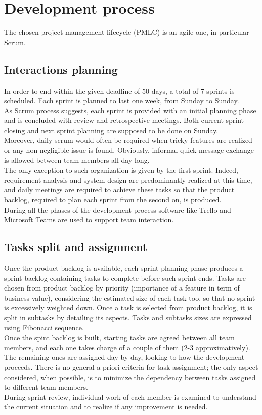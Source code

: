 \chapter{Development process}

The chosen project management lifecycle (PMLC) is an agile one, in particular Scrum. 
\section{Interactions planning}

In order to end within the given deadline of 50 days, a total of 7 sprints is scheduled. Each sprint is planned to last one week, from Sunday to Sunday.
\\
As Scrum process suggests, each sprint is provided with an initial planning phase and is concluded with review and retrospective meetings. Both current sprint closing and next sprint planning are supposed to be done on Sunday.
\\
Moreover, daily scrum would often be required when tricky features are realized or any non negligible issue is found. Obviously, informal quick message exchange is allowed between team members all day long.
\\
The only exception to such organization is given by the first sprint. Indeed, requirement analysis and system design are predominantly realized at this time, and daily meetings are required to achieve these tasks so that the product backlog, required to plan each sprint from the second on, is produced.
\\
During all the phases of the development process software like Trello and Microsoft Teams are used to support team interaction.


\section{Tasks split and assignment}

Once the product backlog is available, each sprint planning phase produces a sprint backlog containing tasks to complete before such sprint ends. Tasks are chosen from product backlog by priority (importance of a feature in term of business value), considering the estimated size of each task too, so that no sprint is excessively weighted down. Once a task is selected from product backlog, it is split in subtasks by detailing its aspects. Tasks and subtasks sizes are expressed using Fibonacci sequence. 
\\
Once the spint backlog is built, starting tasks are agreed between all team members, and each one takes charge of a couple of them (2-3 approximatively). The remaining ones are assigned day by day, looking to how the development proceeds. There is no general a priori criteria for task assignment; the only aspect considered, when possible, is to minimize the dependency between tasks assigned to different team members. 
\\
During sprint review, individual work of each member is examined to understand the current situation and to realize if any improvement is needed.

